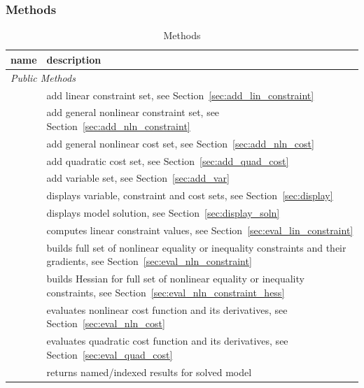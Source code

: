 \documentclass[12pt]{article}
\newcommand{\code}[1]{{\relsize{-0.5}{\tt{{#1}}}}}  %
\numberwithin{equation}{section}
\numberwithin{table}{section}
\numberwithin{figure}{section}
\begin{document}
\subsubsection{Methods}

\begin{table}[!ht]
\centering
\begin{threeparttable}
\caption{\code{opt\_model} Methods}
\label{tab:methods}
\footnotesize
\begin{tabular}{lp{}}
\toprule
name & description \\
\midrule
\multicolumn{2}{l}{\emph{Public Methods}} \\
\code{~~add\_lin\_constraint}	& add linear constraint set, see Section~\ref{sec:add_lin_constraint}	\\
\code{~~add\_nln\_constraint}	& add general nonlinear constraint set, see Section~\ref{sec:add_nln_constraint}	\\
\code{~~add\_nln\_cost}	& add general nonlinear cost set, see Section~\ref{sec:add_nln_cost}	\\
\code{~~add\_quad\_cost}	& add quadratic cost set, see Section~\ref{sec:add_quad_cost}	\\
\code{~~add\_var}	& add variable set, see Section~\ref{sec:add_var}	\\
\code{~~display}	& displays variable, constraint and cost sets, see Section~\ref{sec:display}	\\
\code{~~display\_soln}	& displays model solution, see Section~\ref{sec:display_soln}	\\
\code{~~eval\_lin\_constraint}	& computes linear constraint values, see Section~\ref{sec:eval_lin_constraint}	\\
\code{~~eval\_nln\_constraint}	& builds full set of nonlinear equality or inequality constraints and their gradients, see Section~\ref{sec:eval_nln_constraint}	\\
\code{~~eval\_nln\_constraint\_hess}	& builds Hessian for full set of nonlinear equality or inequality constraints, see Section~\ref{sec:eval_nln_constraint_hess}	\\
\code{~~eval\_nln\_cost}	& evaluates nonlinear cost function and its derivatives\tnote{\ddag}, see Section~\ref{sec:eval_nln_cost}	\\
\code{~~eval\_quad\_cost}	& evaluates quadratic cost function and its derivatives\tnote{\ddag}, see Section~\ref{sec:eval_quad_cost}	\\
\code{~~get\_soln}	& returns named/indexed results for solved model	\\

\end{tabular}
\end{threeparttable}
\end{table}
\end{document}

